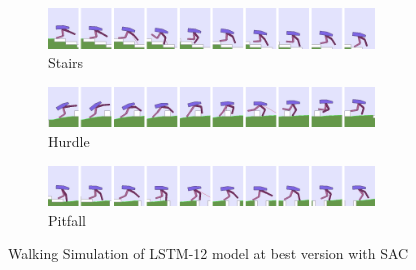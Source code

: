 \begin{figure}[!ht]
	\centering
	\begin{subfigure}{.95\textwidth}
		\centering
		\includegraphics[width=0.95\textwidth]{figures/bipedal/anim/lstm-12-stairs.png}
		\caption{Stairs}
		\label{fig:anim_lstm_stairs}
	\end{subfigure}
	\begin{subfigure}{.95\textwidth}
		\centering
		\includegraphics[width=0.95\textwidth]{figures/bipedal/anim/lstm-12-hurdle.png}
		\caption{Hurdle}
		\label{fig:anim_lstm_hurdle}
	\end{subfigure}
	\begin{subfigure}{.95\textwidth}
		\centering
		\includegraphics[width=0.95\textwidth]{figures/bipedal/anim/lstm-12-pitfall.png}
		\caption{Pitfall}
		\label{fig:anim_lstm_pitfall}
	\end{subfigure}
	\caption{Walking Simulation of LSTM-12 model at best version with SAC}
	\label{fig:lstm_simulation}
\end{figure}

